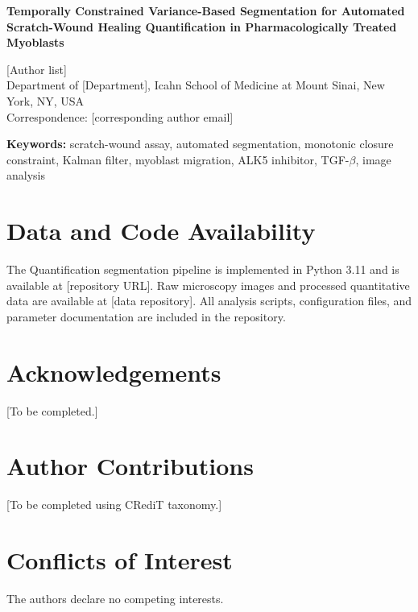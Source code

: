 \documentclass[11pt,a4paper]{article}
\begin{document}
\begin{center}
  {\LARGE\bfseries Temporally Constrained Variance-Based Segmentation for Automated Scratch-Wound Healing Quantification in Pharmacologically Treated Myoblasts}
  \vspace{1em}

  {\large [Author list]}\\[0.5em]
  {\normalsize Department of [Department], Icahn School of Medicine at Mount Sinai, New York, NY, USA}\\[0.5em]
  {\small Correspondence: [corresponding author email]}
\end{center}

\vspace{1em}

\noindent\textbf{Keywords:} scratch-wound assay, automated segmentation, monotonic closure constraint, Kalman filter, myoblast migration, ALK5 inhibitor, TGF-$\beta$, image analysis

\vspace{1em}

\begin{abstract}

\end{abstract}

\newpage






\section*{Data and Code Availability}
The Quantification segmentation pipeline is implemented in Python 3.11 and is available at [repository URL]. Raw microscopy images and processed quantitative data are available at [data repository]. All analysis scripts, configuration files, and parameter documentation are included in the repository.

\section*{Acknowledgements}
[To be completed.]

\section*{Author Contributions}
[To be completed using CRediT taxonomy.]

\section*{Conflicts of Interest}
The authors declare no competing interests.




\newpage

\end{document}
